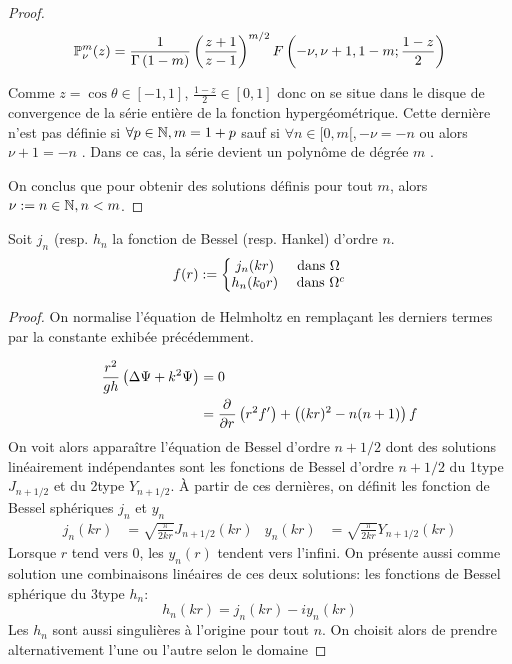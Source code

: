 \begin{proof}
{\[
\mathbb{P}^m_\nu(z) = \dfrac{1}{\Gamma\left(1-m\right)}\left(\dfrac{z+1}{z-1}\right)^{m/2}F\left(-\nu,\nu+1,1-m;\dfrac{1-z}{2}\right)
\]

Comme \(z=\cos\theta \in [-1,1] \), \(\frac{1-z}{2} \in [0,1]\) donc on se situe dans le disque de convergence de la série entière de la fonction hypergéométrique. Cette dernière n'est pas définie si \(\forall p\in \mathbb N, m=1+p \) sauf si \(\forall n \in [0,m[, -\nu = -n \) ou alors \( \nu +1 = -n \) \cite[p.~556]{abramowitz_handbook_1964}. Dans ce cas, la série devient un polynôme de dégrée \(m\) \cite[p.~561]{abramowitz_handbook_1964}.

On conclus que pour obtenir des solutions définis pour tout \(m\), alors \(\nu:=n \in \mathbb N, n< m \).
}


\end{proof}


\begin{prop} Soit \(j_n\) (resp. \(h_n\) la fonction de Bessel (resp. Hankel) d'ordre \(n\).
  \begin{equation}
    f(r) := \left\lbrace
    \begin{matrix}
    j_n(kr) & \text{ dans \(\Omega\) } \\
    h_n(k_0r) & \text{ dans } \Omega^c \\
    \end{matrix}\right.
  \end{equation}
\end{prop}
\begin{proof}
On normalise l'équation de Helmholtz en remplaçant les derniers termes par la constante exhibée précédemment.

\begin{align*}
\dfrac{r^2}{gh} \left(\Delta \Psi + k^2 \Psi\right) &= 0 \\
&= \dfrac{\partial^{{}} }{{\partial r}^{{}}}\left(r^2f'\right) + \left((kr)^2 - n(n+1)\right)f
\end{align*}
  On voit alors apparaître l'équation de Bessel d'ordre \(n +1/2\) dont des solutions linéairement indépendantes sont les fonctions de Bessel d'ordre \(n +1/2\) du 1\ier type \(J_{n+1/2}\) et du 2\ieme type \(Y_{n+1/2}\)\cite[p.~86]{bohren_absorption_2004}\cite[p.~1465]{morse_methods_1953}.
  À partir de ces dernières, on définit les fonction de Bessel sphériques \(j_n\) et \(y_n\)
  \begin{align*}
  j_n(kr) &= \sqrt{\frac{\pi}{2kr}}J_{n+1/2}(kr) &
  y_n(kr) &= \sqrt{\frac{\pi}{2kr}}Y_{n+1/2}(kr)
  \end{align*}
  Lorsque \(r\) tend vers \(0\), les \(y_n(r)\) tendent vers l'infini. On présente aussi comme solution une combinaisons linéaires de ces deux solutions: les fonctions de Bessel sphérique du 3\ieme type \(h_n\):
  \[
  h_n(kr)=j_n(kr)-i y_n(kr)
  \]
  Les \(h_n\) sont aussi singulières à l'origine pour tout \(n\). On choisit alors de prendre alternativement l'une ou l'autre selon le domaine
  \end{proof}


